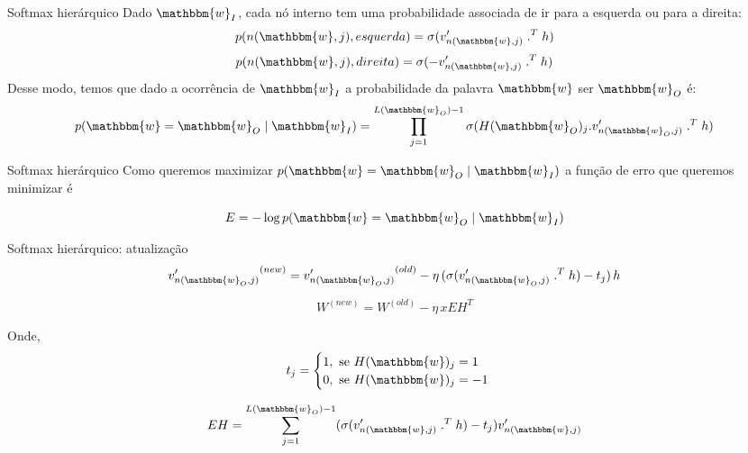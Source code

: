 \documentclass{beamer}
\newcommand{\wo}{\mathbbm{w}}
\begin{document}
\begin{frame}[fragile]{Softmax hierárquico}
 Dado $\wo_I$, cada nó interno tem uma probabilidade associada de ir para a esquerda ou para a direita:
\begin{equation}\label{eq:26}
p(n(\wo,j), esquerda) = \sigma(v^{\prime}_{n(\wo,j)} \; .^{T} \; h)
\end{equation}
\begin{equation}\label{eq:27}
p(n(\wo,j), direita) = \sigma(- v^{\prime}_{n(\wo,j)} \; .^{T} \; h)
\end{equation}
Desse modo, temos que dado a ocorrência de $\wo_I$ a probabilidade da palavra $\wo$ ser $\wo_O$ é:
\begin{equation}\label{eq:28}
p(\wo = \wo_O\; |\; \wo_I) = \prod_{j=1}^{L(\wo_{O})-1} \sigma(H(\wo_O)_j . v^{\prime}_{n(\wo_{O},j)} \; .^{T} \; h)
\end{equation}
\end{frame}

\begin{frame}[fragile]{Softmax hierárquico}
Como queremos maximizar $p(\wo = \wo_O\; |\; \wo_I) $ a função de erro que queremos minimizar é 

\begin{equation}\label{eq:29}
E = - \log p(\wo = \wo_O\; |\; \wo_I)
\end{equation}

\end{frame}

\begin{frame}[fragile]{Softmax hierárquico: atualização}
\begin{equation}\label{eq:30}
{v^{\prime}_{n(\wo_{O},j)}}^{(new)} = {v^{\prime}_{n(\wo_{O},j)}}^{(old)} - \eta \, (\sigma(  v^{\prime}_{n(\wo_{O},j)} \; .^{T} \; h) -t_{j}) \,h
\end{equation}

\vspace{0.1cm}

\begin{equation}\label{eq:31}
W^{(new)} = W^{(old)} - \eta \, x EH^{T}
\end{equation}

\vspace{0.1cm}

\vspace{0.3cm}
Onde,
\[
t_{j}=
\begin{cases}
1, \text{ se } H(\wo)_{j} =1\\
0, \text{ se } H(\wo)_{j} =-1
\end{cases}
\]

\vspace{0.2cm}

\[
EH = \sum_{j=1}^{L(\wo_O) -1} (\sigma(v_{n(\wo,j)}^{\prime} \; .^{T} \; h) - t_j) {v_{n(\wo,j)}^{\prime}}
\]
\end{frame}
\end{document}
